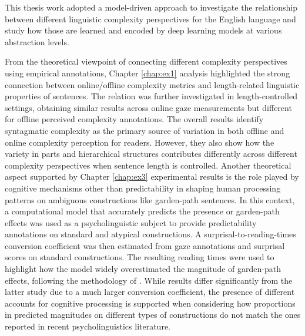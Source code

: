 \documentclass[a4paper, nobind]{templates/ociamthesis}
\begin{document}

This thesis work adopted a model-driven approach to investigate the relationship between different linguistic complexity perspectives for the English language and study how those are learned and encoded by deep learning models at various abstraction levels.

From the theoretical viewpoint of connecting different complexity perspectives using empirical annotations, Chapter \ref{chap:ex1} analysis highlighted the strong connection between online/offline complexity metrics and length-related linguistic properties of sentences. The relation was further investigated in length-controlled settings, obtaining similar results across online gaze measurements but different for offline perceived complexity annotations. The overall results identify syntagmatic complexity as the primary source of variation in both offline and online complexity perception for readers. However, they also show how the variety in parts and hierarchical structures contributes differently across different complexity perspectives when sentence length is controlled. Another theoretical aspect supported by Chapter \ref{chap:ex3} experimental results is the role played by cognitive mechanisms other than predictability in shaping human processing patterns on ambiguous constructions like garden-path sentences. In this context, a computational model that accurately predicts the presence or garden-path effects was used as a psycholinguistic subject to provide predictability annotations on standard and atypical constructions. A surprisal-to-reading-times conversion coefficient was then estimated from gaze annotations and surprisal scores on standard constructions. The resulting reading times were used to highlight how the model widely overestimated the magnitude of garden-path effects, following the methodology of \textcite{schjindel-linzen-2020-single}. While results differ significantly from the latter study due to a much larger conversion coefficient, the presence of different accounts for cognitive processing is supported when considering how proportions in predicted magnitudes on different types of constructions do not match the ones reported in recent psycholinguistics literature.
\end{document}
